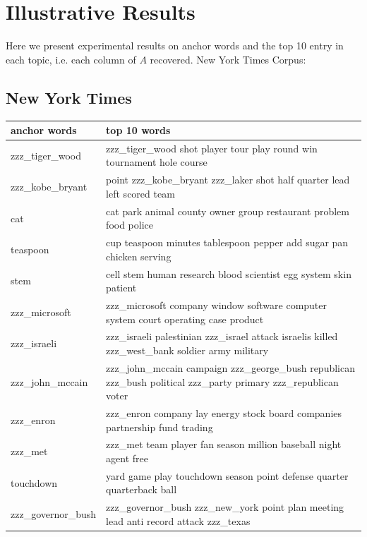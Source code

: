 \documentclass{article}
\begin{document}




\appendix
\section{Illustrative Results}
\label{exp:corpus}
Here we present experimental results on anchor words and the top 10 entry in each topic, i.e. each column of $A$ recovered. New York Times Corpus: 

\subsection{New York Times}
\hspace{-2cm}
  \begin{tabular}{ l | l }
    \hline
    \bf{anchor words} & \bf{top 10 words}\\ \hline
    zzz\_tiger\_wood & zzz\_tiger\_wood shot player tour play round win tournament hole course \\ \hline 
    zzz\_kobe\_bryant & point zzz\_kobe\_bryant zzz\_laker shot half quarter lead left scored team \\ \hline 
    cat & cat park animal county owner group restaurant problem food police \\ \hline 
    teaspoon & cup teaspoon minutes tablespoon pepper add sugar pan chicken serving \\ \hline 
    stem & cell stem human research blood scientist egg system skin patient \\ \hline 
    zzz\_microsoft & zzz\_microsoft company window software computer system court operating case product \\ \hline 
    zzz\_israeli & zzz\_israeli palestinian zzz\_israel attack israelis killed zzz\_west\_bank soldier army military \\ \hline 
    zzz\_john\_mccain & zzz\_john\_mccain campaign zzz\_george\_bush republican zzz\_bush political zzz\_party primary zzz\_republican voter \\ \hline 
    zzz\_enron & zzz\_enron company lay energy stock board companies partnership fund trading \\ \hline 
    zzz\_met & zzz\_met team player fan season million baseball night agent free \\ \hline 
    touchdown & yard game play touchdown season point defense quarter quarterback ball \\ \hline 
    zzz\_governor\_bush & zzz\_governor\_bush zzz\_new\_york point plan meeting lead anti record attack zzz\_texas \\ \hline 

\end{tabular}
\end{document}

